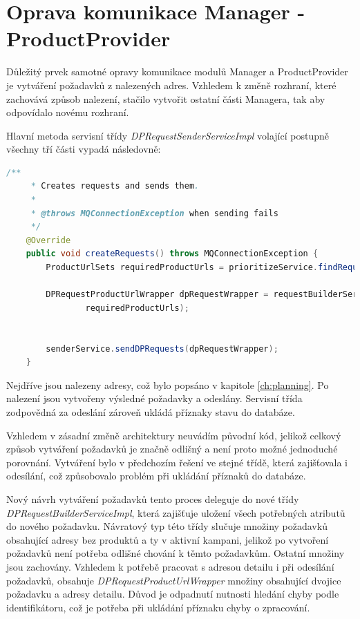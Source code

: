 \documentclass[thesis=B,czech]{FITthesis}[2012/06/26]
\begin{document}
\section{Oprava komunikace Manager - ProductProvider}
Důležitý prvek samotné opravy komunikace modulů Manager a ProductProvider je vytváření požadavků z nalezených adres.
Vzhledem k změně rozhraní, které zachovává způsob nalezení, stačilo vytvořit ostatní části Managera, tak aby odpovídalo novému rozhraní.
\par
Hlavní metoda servisní třídy \textit{DPRequestSenderServiceImpl} volající postupně všechny tří části vypadá následovně:
\begin{lstlisting}[language=Java]
    /**
     * Creates requests and sends them.
     *
     * @throws MQConnectionException when sending fails
     */
    @Override
    public void createRequests() throws MQConnectionException {
        ProductUrlSets requiredProductUrls = prioritizeService.findRequiredProductUrls();

        DPRequestProductUrlWrapper dpRequestWrapper = requestBuilderService.create(
                requiredProductUrls);


        senderService.sendDPRequests(dpRequestWrapper);
    }
\end{lstlisting}
Nejdříve jsou nalezeny adresy, což bylo popsáno v kapitole \ref{ch:planning}. Po nalezení jsou vytvořeny výsledné požadavky
a odeslány. Servisní třída zodpovědná za odeslání zároveň ukládá příznaky stavu do databáze.
\par
Vzhledem v zásadní změně architektury neuvádím původní kód, jelikož celkový způsob vytváření požadavků je značně odlišný a není proto možné jednoduché porovnání. Vytváření bylo v předchozím řešení ve stejné třídě, která zajišťovala i odesílání, což způsobovalo problém při ukládání příznaků do databáze.
\par
Nový návrh vytváření požadavků tento proces deleguje do nové 
třídy  \\ \textit{DPRequestBuilderServiceImpl}, která zajišťuje uložení všech potřebných atributů do nového požadavku. Návratový typ této třídy slučuje množiny požadavků obsahující adresy bez produktů a 
ty v aktivní kampani, jelikož po vytvoření požadavků není potřeba odlišné chování k těmto požadavkům. Ostatní množiny jsou 
zachovány. Vzhledem k potřebě pracovat s adresou detailu i při odesílání požadavků, obsahuje \textit{DPRequestProductUrlWrapper}
množiny obsahující dvojice požadavku a adresy detailu. Důvod je odpadnutí nutnosti hledání chyby podle identifikátoru, což je potřeba
při ukládání příznaku chyby o zpracování.
\end{document}
